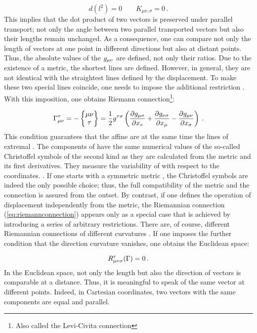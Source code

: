 \documentclass[final]{article}
\begin{document}
\begin{equation*}
d\left({l}^{2}\right)=0 \quad \quad K_{\mu \nu, \sigma}= 0\,.
\end{equation*}
% 
This implies that the dot product of two vectors is preserved under parallel transport; not only the angle between two parallel transported vectors but also their lengths remain unchanged. As a consequence, one can compare not only the length of vectors at one point in different directions but also at distant points. Thus, the absolute values of the $g_{\mu\nu}$ are defined, not only their ratios. Due to the existence of a metric, the shortest lines are defined. However, in general, they are not identical with the straightest lines defined by the displacement. To make these two special lines coincide, one needs to impose the additional restriction \sym. With this imposition, one obtains Riemann connection\footnote{Also called the Levi-Civita connection}:

\begin{equation}\label{eq:riemannconnection}
\Gamma^\tau_{\mu\nu}=-\begin{Bmatrix} \mu \nu \\ \tau \end{Bmatrix} = \frac{1}{2} {g}^{\tau \sigma}\left(\frac{\partial {g}_{\mu \sigma}}{\partial {x}_{v}}+\frac{\partial {g}_{\nu \sigma}}{\partial {x}_{\mu}}-\frac{\partial {g}_{\mu \nu}}{\partial {x}_{\sigma}}\right)\,.
\end{equation}
%
This condition guarantees that the affine  are at the same time the lines of extremal . The components of \Gtmn have the same numerical values of the so-called Christoffel symbols of the second kind as they are calculated from the metric \gmn and its first derivatives. They measure the variability of \gmn with respect to the coordinates. . If one starts with a symmetric metric \gmn, the Christoffel symbols are indeed the only possible choice; thus, the full compatibility of the metric and the connection is assured from the outset. By contrast, if one defines the operation of displacement independently from the metric, the Riemannian connection (\cref{eq:riemannconnection}) appears only as a special case that is achieved by introducing a series of arbitrary restrictions. There are, of course, different Riemannian connections of different curvatures \ritea. If one imposes the further condition that the direction curvature  vanishes, one obtains the Euclidean space:

 \begin{equation*}
 R_{\mu \nu \sigma}^{\tau}(\Gamma)=0\,.
 \end{equation*}
%
In the Euclidean space, not only the length but also the direction of vectors is comparable at a distance. Thus, it is meaningful to speak of the same vector at different points. Indeed, in Cartesian coordinates, two vectors with the same components are equal and parallel.
\end{document}

